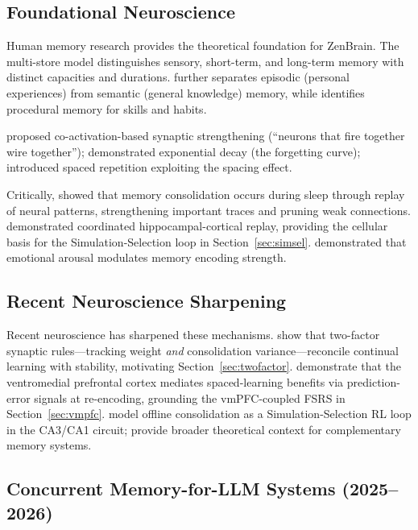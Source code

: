\documentclass{article}
\begin{document}
\subsection{Foundational Neuroscience}

Human memory research provides the theoretical foundation for ZenBrain.
The multi-store model \citep{atkinson1968} distinguishes sensory,
short-term, and long-term memory with distinct capacities and durations.
\citet{tulving1972} further separates episodic (personal experiences)
from semantic (general knowledge) memory,
while \citet{cohen1980} identifies procedural memory for skills and habits.

\citet{hebb1949} proposed co-activation-based synaptic strengthening
(``neurons that fire together wire together''); \citet{ebbinghaus1885}
demonstrated exponential decay (the forgetting curve);
\citet{pimsleur1967} introduced spaced repetition exploiting the
spacing effect.

Critically, \citet{stickgold2013} showed that memory consolidation occurs
during sleep through replay of neural patterns,
strengthening important traces and pruning weak connections.
\citet{ji2007,oneill2010} demonstrated coordinated hippocampal-cortical replay,
providing the cellular basis for the Simulation-Selection loop in Section~\ref{sec:simsel}.
\citet{mcgaugh2004} demonstrated that emotional arousal modulates
memory encoding strength.

\subsection{Recent Neuroscience Sharpening}

Recent neuroscience has sharpened these mechanisms.
\citet{zenke2025,zenke2017} show that two-factor synaptic rules---tracking weight
\emph{and} consolidation variance---reconcile continual learning with stability,
motivating Section~\ref{sec:twofactor}.
\citet{zou2025} demonstrate that the ventromedial prefrontal cortex mediates
spaced-learning benefits via prediction-error signals at re-encoding,
grounding the vmPFC-coupled FSRS in Section~\ref{sec:vmpfc}.
\citet{chen2025} model offline consolidation as a Simulation-Selection RL loop
in the CA3/CA1 circuit; \citet{kumaran2016,squire1992} provide broader theoretical
context for complementary memory systems.

\subsection{Concurrent Memory-for-LLM Systems (2025--2026)}
\end{document}
